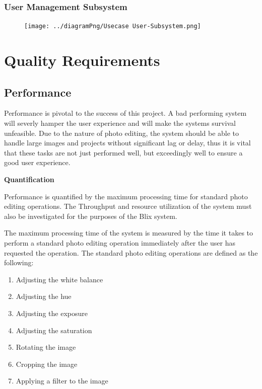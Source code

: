\documentclass[11pt,a4paper]{article}
\begin{document}
\subsubsection*{User Management Subsystem}
\begin{figure}[htbp]
    \centering
    \texttt{[image: ../diagramPng/Usecase User-Subsystem.png]}
\end{figure}


\pagebreak

\section*{Quality Requirements}

\subsection*{Performance}

Performance is pivotal to the success of this project. A bad performing system
will severly hamper the user experience and will make the systems survival unfeasible.
Due to the nature of photo editing, the system should be able to handle large
images and projects without significant lag or delay, thus it is vital that these tasks are 
not just performed well, but exceedingly well to ensure a good user experience.

{\bf Quantification}

Performance is quantified by the maximum processing time for standard photo editing operations.
The Throughput and resource utilization of the system must also be investigated for the purposes
of the Blix system.

The maximum processing time of the system is measured by the time it takes to perform a standard photo editing operation
immediately after the user has requested the operation. The standard photo editing operations are defined as the following:
\begin{enumerate}
    \item Adjusting the white balance
    \item Adjusting the hue
    \item Adjusting the exposure
    \item Adjusting the saturation
    \item Rotating the image
    \item Cropping the image
    \item Applying a filter to the image
\end{enumerate}
\end{document}
